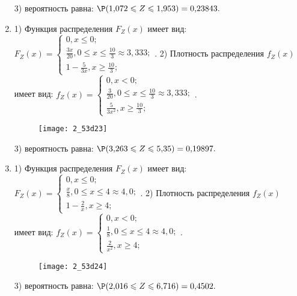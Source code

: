 \documentclass[a4paper,12pt]{article}
\begin{document}
\begin{enumerate}
3) вероятность равна:
$
\P(1,\!072\leqslant Z\leqslant 1,\!953)=
0,\!23843.
$



\item


1) Функция распределения $F_Z(x)$ имеет вид:
$
F_Z(x)=\left\{
\begin{array}{l}
0, x\leqslant 0;\\
\frac{3 x}{20}, 0\leqslant x\leqslant \frac{10}{3}\approx 3,\!333;\\
1 - \frac{5}{3 x}, x\geqslant\frac{10}{3};
\end{array}.
\right.
$
2) Плотность распределения $f_Z(x)$ имеет вид:
$
f_Z(x)=\left\{
\begin{array}{l}
0, x<0;\\
\frac{3}{20}, 0\leqslant x\leqslant \frac{10}{3}\approx 3,\!333;\\
\frac{5}{3 x^{2}}, x\geqslant\frac{10}{3};
\end{array}.
\right.
$


\begin{figure}[H]
    \texttt{[image: 2\_53d23]}
\end{figure}


3) вероятность равна:
$
\P(3,\!263\leqslant Z\leqslant 5,\!35)=
0,\!19897.
$



\item


1) Функция распределения $F_Z(x)$ имеет вид:
$
F_Z(x)=\left\{
\begin{array}{l}
0, x\leqslant 0;\\
\frac{x}{8}, 0\leqslant x\leqslant 4\approx 4,\!0;\\
1 - \frac{2}{x}, x\geqslant4;
\end{array}.
\right.
$
2) Плотность распределения $f_Z(x)$ имеет вид:
$
f_Z(x)=\left\{
\begin{array}{l}
0, x<0;\\
\frac{1}{8}, 0\leqslant x\leqslant 4\approx 4,\!0;\\
\frac{2}{x^{2}}, x\geqslant4;
\end{array}.
\right.
$


\begin{figure}[H]
    \texttt{[image: 2\_53d24]}
\end{figure}


3) вероятность равна:
$
\P(2,\!016\leqslant Z\leqslant 6,\!716)=
0,\!4502.
$




\end{enumerate}
\end{document}
